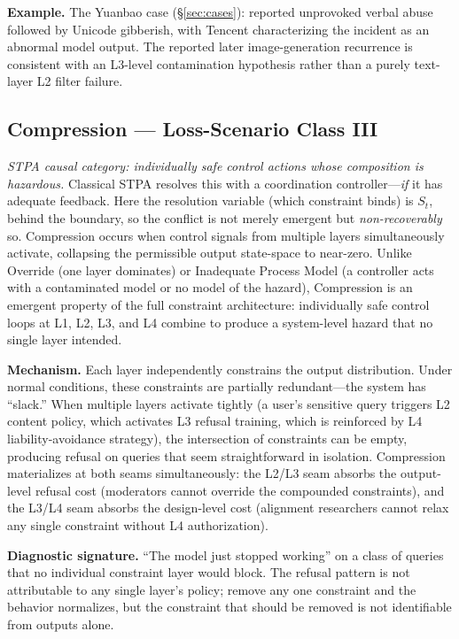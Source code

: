 \textbf{Example.} The Yuanbao case (\S\ref{sec:cases}): reported unprovoked verbal abuse followed by Unicode gibberish, with Tencent characterizing the incident as an abnormal model output. The reported later image-generation recurrence is consistent with an L3-level contamination hypothesis rather than a purely text-layer L2 filter failure.

\subsection{Compression --- Loss-Scenario Class III}

\emph{STPA causal category: individually safe control actions whose composition is hazardous.} Classical STPA resolves this with a coordination controller---\emph{if} it has adequate feedback. Here the resolution variable (which constraint binds) is $S_t$, behind the boundary, so the conflict is not merely emergent but \emph{non-recoverably} so. Compression occurs when control signals from multiple layers simultaneously activate, collapsing the permissible output state-space to near-zero. Unlike Override (one layer dominates) or Inadequate Process Model (a controller acts with a contaminated model or no model of the hazard), Compression is an emergent property of the full constraint architecture: individually safe control loops at L1, L2, L3, and L4 combine to produce a system-level hazard that no single layer intended.

\textbf{Mechanism.} Each layer independently constrains the output distribution. Under normal conditions, these constraints are partially redundant---the system has ``slack.'' When multiple layers activate tightly (a user's sensitive query triggers L2 content policy, which activates L3 refusal training, which is reinforced by L4 liability-avoidance strategy), the intersection of constraints can be empty, producing refusal on queries that seem straightforward in isolation. Compression materializes at both seams simultaneously: the L2/L3 seam absorbs the output-level refusal cost (moderators cannot override the compounded constraints), and the L3/L4 seam absorbs the design-level cost (alignment researchers cannot relax any single constraint without L4 authorization).

\textbf{Diagnostic signature.} ``The model just stopped working'' on a class of queries that no individual constraint layer would block. The refusal pattern is not attributable to any single layer's policy; remove any one constraint and the behavior normalizes, but the constraint that should be removed is not identifiable from outputs alone.

